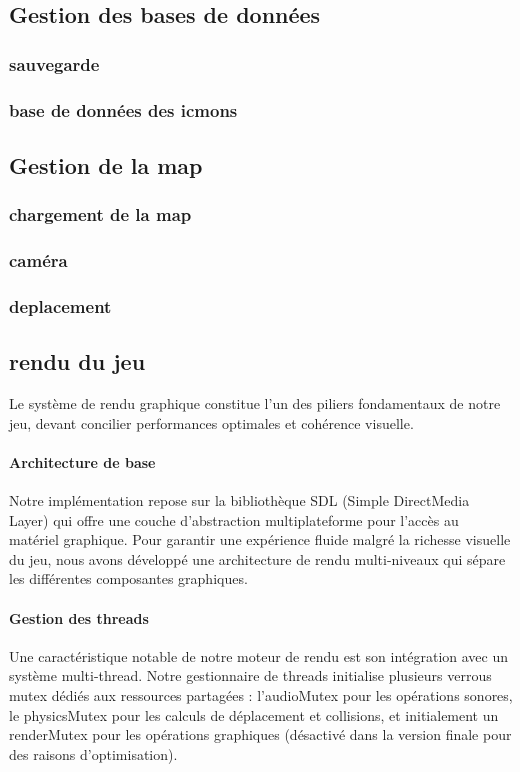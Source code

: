 \documentclass[12pt,a4paper, twoside]{article}
\begin{document}
\subsection{Gestion des bases de données}
    \subsubsection{sauvegarde}
    \subsubsection{base de données des icmons}

\subsection{Gestion de la map}
    \subsubsection{chargement de la map}
    \subsubsection{caméra}
    \subsubsection{deplacement}

\subsection{rendu du jeu}
Le système de rendu graphique constitue l'un des piliers fondamentaux de notre jeu, devant concilier performances optimales et cohérence visuelle.

\paragraph{Architecture de base} Notre implémentation repose sur la bibliothèque SDL (Simple DirectMedia Layer) qui offre une couche d'abstraction multiplateforme pour l'accès au matériel graphique. Pour garantir une expérience fluide malgré la richesse visuelle du jeu, nous avons développé une architecture de rendu multi-niveaux qui sépare les différentes composantes graphiques.

\paragraph{Gestion des threads} Une caractéristique notable de notre moteur de rendu est son intégration avec un système multi-thread. Notre gestionnaire de threads initialise plusieurs verrous mutex dédiés aux ressources partagées : l'audioMutex pour les opérations sonores, le physicsMutex pour les calculs de déplacement et collisions, et initialement un renderMutex pour les opérations graphiques (désactivé dans la version finale pour des raisons d'optimisation).
\end{document}
